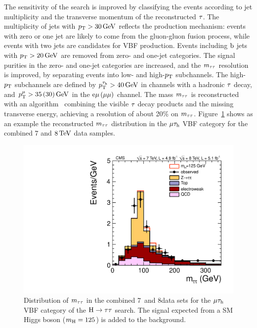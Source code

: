 \documentclass[11pt,twoside,a4paper,cmspaper,final]{cms-tdr}
\begin{document}
The sensitivity of the search is improved by classifying the
events according to jet multiplicity and the transverse
momentum of the reconstructed $\tau$.  The multiplicity of jets
with $p_{\mathrm{T}}>30\,\text{Ge\hspace{-.08em}V}$ reflects the production mechanism:
events with zero or one jet are likely to come from the
gluon-gluon fusion process, while events with two jets are candidates for VBF
production. Events including $\mathrm{b}$ jets with $p_{\mathrm{T}}>20\,\text{Ge\hspace{-.08em}V}$ are removed from zero- and one-jet categories.
The signal purities in the zero- and one-jet
categories are increased, and the $m_{\tau\tau}$ resolution is
improved, by separating events into low- and high-$p_{\mathrm{T}}$ subchannels.
The high-$p_{\mathrm{T}}$ subchannels are defined by
$p_{\mathrm{T}}^{\tau_{\mathrm{h}}}>40\,\text{Ge\hspace{-.08em}V}$ in channels with a hadronic
$\tau$ decay, and $p_{\mathrm{T}}^{\mu}>35\,(30)\,\text{Ge\hspace{-.08em}V}$ in the
$\mathrm{e}{\mu}\,({\mu}{\mu})$ channel.
The mass $m_{\tau\tau}$ is reconstructed with an algorithm~\cite{Chatrchyan:2011nx} combining the
visible $\tau$ decay products and the missing transverse energy, achieving a resolution of about 20\% on $m_{\tau\tau}$.
Figure~\ref{fig:HttMass} shows
as an example the reconstructed $m_{\tau\tau}$ distribution in
the $\mu\tau_{\mathrm h}$ VBF category for the combined $7$ and
$8\,\text{Te\hspace{-.08em}V}$ data samples.

\begin{figure}[htbp]
  \begin{center}
    \includegraphics[width=\cmsFigWideWidth]{muTau_vbf_rescaled_7and8TeV_v10}
    \caption{Distribution of $m_{\tau\tau}$ in the combined 7~and 8\TeV data sets for the $\mu\tau_{\mathrm h}$ VBF category of the
    $\mathrm{H}\to\tau\tau$ search. The signal expected from a SM Higgs boson
    ($m_{\mathrm{H}} = 125$\GeV) is added to the background.}
    \label{fig:HttMass}
  \end{center}
\end{figure}
\end{document}
